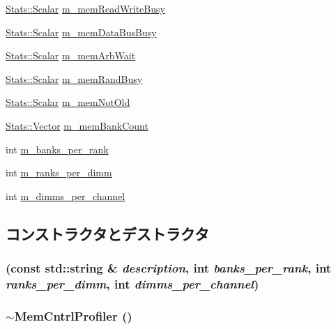 \begin{DoxyCompactItemize}
\hyperlink{classStats_1_1Scalar}{Stats::Scalar} \hyperlink{classMemCntrlProfiler_ab048c64d46305c291476b8f9c9647dc2}{m\_\-memReadWriteBusy}
\item 
\hyperlink{classStats_1_1Scalar}{Stats::Scalar} \hyperlink{classMemCntrlProfiler_adcafd7991784755f01d1a315a75c5a6d}{m\_\-memDataBusBusy}
\item 
\hyperlink{classStats_1_1Scalar}{Stats::Scalar} \hyperlink{classMemCntrlProfiler_a670329eb584123ff65355a003815dc44}{m\_\-memArbWait}
\item 
\hyperlink{classStats_1_1Scalar}{Stats::Scalar} \hyperlink{classMemCntrlProfiler_ad5edffafb4e64732835e1a1783cce7e2}{m\_\-memRandBusy}
\item 
\hyperlink{classStats_1_1Scalar}{Stats::Scalar} \hyperlink{classMemCntrlProfiler_aeb661812b65ddc2d1613926c37775b5a}{m\_\-memNotOld}
\item 
\hyperlink{classStats_1_1Vector}{Stats::Vector} \hyperlink{classMemCntrlProfiler_a4e5530d4b53410b9b6ad01ada631ad45}{m\_\-memBankCount}
\item 
int \hyperlink{classMemCntrlProfiler_af5a8b76f5c8fdb638e49a8c11c61f492}{m\_\-banks\_\-per\_\-rank}
\item 
int \hyperlink{classMemCntrlProfiler_a734869c8bd10780ed7f61eadb638f30c}{m\_\-ranks\_\-per\_\-dimm}
\item 
int \hyperlink{classMemCntrlProfiler_acf7c3dd8c1a61ce9fe7ca2e026150caf}{m\_\-dimms\_\-per\_\-channel}
\end{DoxyCompactItemize}


\subsection{コンストラクタとデストラクタ}
\hypertarget{classMemCntrlProfiler_a0675bcfd8eb447c6650b74c4570c2370}{
\subsubsection[{MemCntrlProfiler}]{ (const std::string \& {\em description}, \/  int {\em banks\_\-per\_\-rank}, \/  int {\em ranks\_\-per\_\-dimm}, \/  int {\em dimms\_\-per\_\-channel})}}
\label{classMemCntrlProfiler_a0675bcfd8eb447c6650b74c4570c2370}
\hypertarget{classMemCntrlProfiler_a345a0d61dbc5fd08aa4ded24b45612eb}{
\subsubsection[{$\sim$MemCntrlProfiler}]{\setlength{\rightskip}{0pt plus 5cm}$\sim${\bf MemCntrlProfiler} ()}}
\label{classMemCntrlProfiler_a345a0d61dbc5fd08aa4ded24b45612eb}



